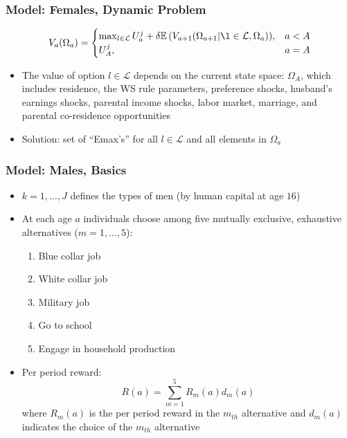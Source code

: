 \begin{frame}
	\frametitle{Model: Females, Dynamic Problem}
	\begin{eqnarray}
		V_{a} (\Omega_{a}) = 
		\begin{cases}	
			\max_{l \in \mathcal{L}} {U_{a}^j + \delta \mathbb{E} \left(  V_{a+1}(\Omega_{a+1} | \l \in \mathcal{L}, \Omega_{a}) \right) }, & a < A \nonumber \\
			U_{A}^j, & a = A \nonumber
		\end{cases}  
	\end{eqnarray}
	\begin{itemize}
		\item The value of option $l \in \mathcal{L}$ depends on the current state space: $\Omega_{A}$, which includes residence, the WS rule parameters, preference shocks, husband's earnings shocks, parental income shocks, labor market, marriage, and parental co-residence opportunities
		\item Solution: set of ``Emax's'' for all $l \in \mathcal{L}$ and all elements in $\Omega_{a}$ 
	\end{itemize}
\end{frame}

\begin{frame}
	\frametitle{Model: Males, Basics}
	\begin{itemize}
		\item $k = 1, \ldots, J$ defines the types of men (by human capital at age $16$)
		\item At each age $a$ individuals choose among five mutually exclusive, exhaustive alternatives ($m = 1, \ldots, 5$):
		\begin{enumerate}
			\item Blue collar job
			\item White collar job
			\item Military job
			\item Go to school
			\item Engage in household production
		\end{enumerate}
		\item Per period reward:
		\begin{equation}
			R(a) = \sum \limits _{m=1} ^ 5 R_{m}(a)d_{m}(a) \nonumber
		\end{equation}
		\noindent where $R_{m}(a)$ is the per period reward in the $m_{th}$ alternative and $d_{m}(a)$ indicates the choice of the $m_{th}$ alternative 
	\end{itemize}
\end{frame}


